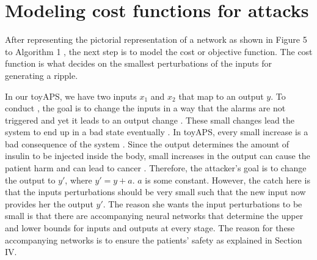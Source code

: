\section{Modeling cost functions for attacks}
\label{section:costfunction}
After representing the pictorial representation of a network as shown in Figure 5 to Algorithm 1 , 
the next step is to model the cost or objective function. The cost function is what decides on the smallest perturbations of the inputs for generating a ripple. 

In our toyAPS, we have two inputs $x_1$ and $x_2$ that map to an output $y$. To conduct \attack, the goal is to change the inputs in a way that the alarms are not triggered and yet it leads to an output change . 
These small changes lead the system to end up in a bad state eventually . 
In toyAPS, every small increase is a bad consequence of the system . 
Since the output determines the amount of insulin to be injected inside the body, 
small increases in the output can cause the patient harm \cite{ZHANG2019403} and can lead to cancer .
Therefore, the attacker's goal is to change the output to $y'$, where $y' = y + a$. $a$ is some constant. 
However, the catch here is that the inputs perturbations should be very small such that the new input now provides her the output $y'$.  The reason she wants the input perturbations to be small is that there are accompanying neural networks that determine the upper and lower bounds for inputs and outputs at every stage. The reason for these accompanying networks is to ensure the patients' safety as explained in Section IV. 



